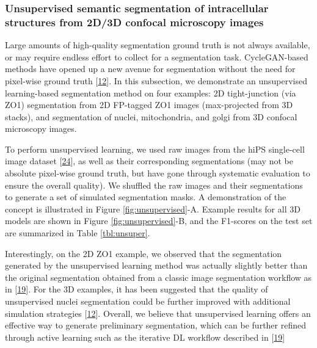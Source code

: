 \hypertarget{unsupervised-semantic-segmentation-of-intracellular-structures-from-2d3d-confocal-microscopy-images}{%
\subsubsection{Unsupervised semantic segmentation of intracellular structures from 2D/3D confocal microscopy images}\label{unsupervised-semantic-segmentation-of-intracellular-structures-from-2d3d-confocal-microscopy-images}}

Large amounts of high-quality segmentation ground truth is not always available, or may require endless effort to collect for a segmentation task. CycleGAN-based methods have opened up a new avenue for segmentation without the need for pixel-wise ground truth {[}\protect\hyperlink{ref-RuFP3CS3}{12}{]}. In this subsection, we demonstrate an unsupervised learning-based segmentation method on four examples: 2D tight-junction (via ZO1) segmentation from 2D FP-tagged ZO1 images (max-projected from 3D stacks), and segmentation of nuclei, mitochondria, and golgi from 3D confocal microscopy images.

To perform unsupervised learning, we used raw images from the hiPS single-cell image dataset {[}\protect\hyperlink{ref-5sGcmDuy}{24}{]}, as well as their corresponding segmentations (may not be absolute pixel-wise ground truth, but have gone through systematic evaluation to ensure the overall quality). We shuffled the raw images and their segmentations to generate a set of simulated segmentation masks. A demonstration of the concept is illustrated in Figure \ref{fig:unsupervised}-A. Example results for all 3D models are shown in Figure \ref{fig:unsupervised}-B, and the F1-scores on the test set are summarized in Table \ref{tbl:unsuper}.

Interestingly, on the 2D ZO1 example, we observed that the segmentation generated by the unsupervised learning method was actually slightly better than the original segmentation obtained from a classic image segmentation workflow as in {[}\protect\hyperlink{ref-jM3v1UjQ}{19}{]}. For the 3D examples, it has been suggested that the quality of unsupervised nuclei segmentation could be further improved with additional simulation strategies {[}\protect\hyperlink{ref-RuFP3CS3}{12}{]}. Overall, we believe that unsupervised learning offers an effective way to generate preliminary segmentation, which can be further refined through active learning such as the iterative DL workflow described in {[}\protect\hyperlink{ref-jM3v1UjQ}{19}{]}

